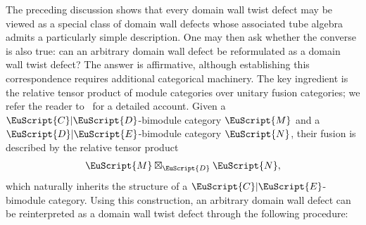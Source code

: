 \documentclass[a4paper,11pt]{article}
\theoremstyle{definition}
\theoremstyle{remark}
\newcommand\eC           {\EuScript{C}}
\newcommand\eD           {\EuScript{D}}
\newcommand\eE          {\EuScript{E}}
\newcommand\eM          {\EuScript{M}}
\newcommand\eN         {\EuScript{N}}
\begin{document}
The preceding discussion shows that every domain wall twist defect may be viewed as a special class of domain wall defects whose associated tube algebra admits a particularly simple description. One may then ask whether the converse is also true: can an arbitrary domain wall defect be reformulated as a domain wall twist defect? The answer is affirmative, although establishing this correspondence requires additional categorical machinery.
The key ingredient is the relative tensor product of module categories over unitary fusion categories; we refer the reader to~\cite{etingof2010fusion} for a detailed account. Given a $\eC|\eD$-bimodule category $\eM$ and a $\eD|\eE$-bimodule category $\eN$, their fusion is described by the relative tensor product
\begin{equation}
    \eM\boxtimes_{\eD}\eN,
\end{equation}
which naturally inherits the structure of a $\eC|\eE$-bimodule category.
Using this construction, an arbitrary domain wall defect can be reinterpreted as a domain wall twist defect through the following procedure:
\end{document}

